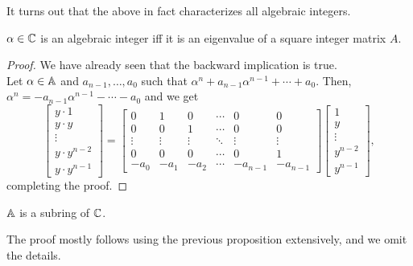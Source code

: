 		It turns out that the above in fact characterizes all algebraic integers.

		\begin{fprop}
			\label{prop: alg int iff integer eigenvalue}
			$\alpha \in \mathbb{C}$ is an algebraic integer iff it is an eigenvalue of a square integer matrix $A$. 
		\end{fprop}
		\begin{proof}
			We have already seen that the backward implication is true.\\
			Let $\alpha \in \mathbb{A}$ and $a_{n-1},\ldots,a_{0}$ such that $\alpha^n + a_{n-1}\alpha^{n-1} + \cdots + a_0$. Then, $\alpha^n = -a_{n-1}\alpha^{n-1}-\cdots-a_0$ and we get
			\[
				\begin{bmatrix}
					y\cdot 1 \\ y \cdot y \\ \vdots \\ y \cdot y^{n-2} \\ y \cdot y^{n-1}
				\end{bmatrix}
				= 
				\begin{bmatrix}
					0 & 1 & 0 & \cdots & 0 & 0 \\
					0 & 0 & 1 & \cdots & 0 & 0 \\
					\vdots & \vdots & \vdots & \ddots & \vdots & \vdots \\
					0 & 0 & 0 & \cdots & 0 & 1 \\
					-a_0 & -a_1 & -a_2 & \cdots & -a_{n-1} & -a_{n-1}
				\end{bmatrix}
				\begin{bmatrix}
					1 \\ y \\ \vdots \\ y^{n-2} \\ y^{n-1}
				\end{bmatrix},
			\]
			completing the proof.
		\end{proof}

		\begin{fprop}
			\label{prop: alg int subring}
			$\mathbb{A}$ is a subring of $\mathbb{C}$.
		\end{fprop}
		The proof mostly follows using the previous proposition extensively, and we omit the details.




\clearpage